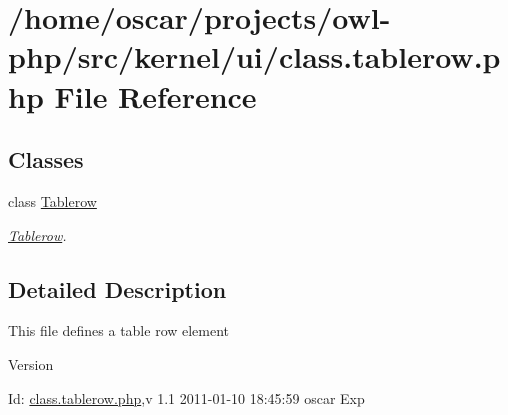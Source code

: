 \section{/home/oscar/projects/owl-\/php/src/kernel/ui/class.tablerow.php File Reference}
\label{class_8tablerow_8php}
\subsection*{Classes}
\begin{DoxyCompactItemize}
\item 
class \hyperlink{classTablerow}{Tablerow}
\begin{DoxyCompactList}\small\item\em \hyperlink{classTablerow}{Tablerow}. \item\end{DoxyCompactList}\end{DoxyCompactItemize}


\subsection{Detailed Description}
This file defines a table row element \begin{DoxyVersion}{Version}

\end{DoxyVersion}
\begin{DoxyParagraph}{Id:}
\hyperlink{class_8tablerow_8php}{class.tablerow.php},v 1.1 2011-\/01-\/10 18:45:59 oscar Exp 
\end{DoxyParagraph}
